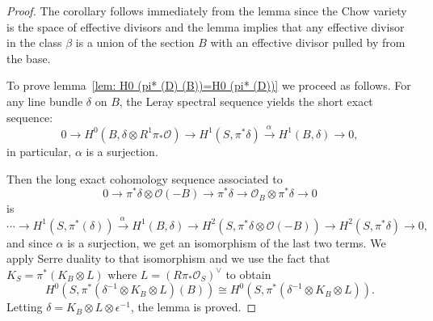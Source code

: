 \documentclass{amsart}
\theoremstyle{definition}
\renewcommand{\O}{\mathcal{O}}
\newcommand{\rt}[1]{\stackrel{#1\,}{\rightarrow}}
\newcommand{\Rt}[1]{\stackrel{#1\,}{\longrightarrow}}
\begin{document}
\begin{proof}
The corollary follows immediately from the lemma since the Chow
variety is the space of effective divisors and the lemma implies that
any effective divisor in the class $\beta $ is a union of the section
$B$ with an effective divisor pulled by from the base.

To prove lemma~\ref{lem: H0 (pi* (D) (B))=H0 (pi* (D))} we proceed as
follows. For any line bundle $\delta $ on $B$, the Leray spectral
sequence yields the short exact sequence:
\[
0\to H^{0} (B,\delta \otimes R^{1}\pi _{*}\O )\to H^{1} (S,\pi ^{*}\delta )\Rt{\alpha } H^{1} (B,\delta )\to 0,
\]
in particular, $\alpha $ is a surjection.

Then the long exact cohomology sequence associated to 
\[
0\to \pi ^{*}\delta \otimes \O (-B)\to \pi ^{*}\delta \to \O _{B}\otimes \pi ^{*}\delta \to 0
\]
is
\[
\dotsb \to H^{1} (S,\pi ^{*} (\delta ))\rt{\alpha }H^{1} (B,\delta )\to H^{2} (S,\pi ^{*}\delta \otimes \O (-B))\to H^{2} (S,\pi ^{*}\delta )\to 0,
\]
and since $\alpha $ is a surjection, we get an isomorphism of the last
two terms. We apply Serre duality to that isomorphism and we use the
fact that $K_{S} = \pi ^{*} (K_{B}\otimes L)$ where $L = \left(R\pi
_{*}\O _{S} \right)^{\vee }$ \cite[prop?]{Fr-Mo} to obtain
\[
H^{0} (S,\pi ^{*} (\delta ^{-1}\otimes K_{B}\otimes L) (B)) \cong H^{0}(S,\pi ^{*} (\delta ^{-1}\otimes K_{B}\otimes L)).
\]
Letting $\delta =K_{B}\otimes L\otimes \epsilon ^{-1}$, the lemma is
proved. 
\end{proof}


     


\end{document}
